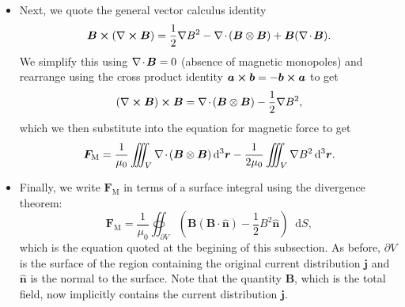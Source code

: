 \documentclass[11pt, a4paper]{article}
\newcommand{\diff}{\mathop{}\!\mathrm{d}} %
\newcommand{\dr}{\diff^{3} \r}  %
\renewcommand{\vec}[1]{\bm{#1}} %
\newcommand{\uvec}[1]{\hat{\vec{#1}}} %
\renewcommand{\r}{\vec{r}}
\newcommand{\B}{\vec{B}} %
\newcommand{\mm}{\mu_{0}}  %
\renewcommand{\j}{\vec{j}}  %
\renewcommand{\div}{\nabla \mspace{-2mu} \cdot \mspace{-2mu}}
\renewcommand{\curl}{\nabla \cross}
\renewcommand{\grad}{\nabla}
\begin{document}
\begin{itemize}
    \item Next, we quote the general vector calculus identity
	\begin{equation*}
		\B \cross (\curl \B) = \frac{1}{2}\grad B^{2} - \div (\B \otimes \B) + \B(\div \B).
	\end{equation*}
    We simplify this using $ \div \B = 0 $ (absence of magnetic monopoles) and rearrange using the cross product identity $ \vec{a} \cross \vec{b} = - \vec{b} \cross \vec{a} $ to get
    \begin{equation*}
        (\curl \B) \cross \B = \div (\B \otimes \B) - \frac{1}{2} \grad B^{2},
    \end{equation*}
    which we then substitute into the equation for magnetic force to get
	\begin{equation*}
		\vec{F}_{\text{M}} = \frac{1}{\mm}\iiint_{V} \div (\B \otimes \B)\dr - \frac{1}{2\mm}\iiint_{V} \grad B^{2}\dr.
	\end{equation*}
	
	\item Finally, we write $ \vec{F}_{\text{M}} $ in terms of a surface integral using the divergence theorem:
	\begin{equation*}
        \vec{F}_{\text{M}} = \frac{1}{\mm}\oiint_{\partial V}\left(\B(\B \cdot \uvec{n}) - \frac{1}{2}B^{2} \uvec{n} \right)\diff S,
	\end{equation*}
    which is the equation quoted at the begining of this subsection. As before, $ \partial V $ is the surface of the region containing the original current distribution $ \j $ and $ \uvec{n}  $ is the normal to the surface. Note that the quantity $ \B $, which is the total field, now implicitly contains the current distribution $ \j $.
\end{itemize}
\end{document}
